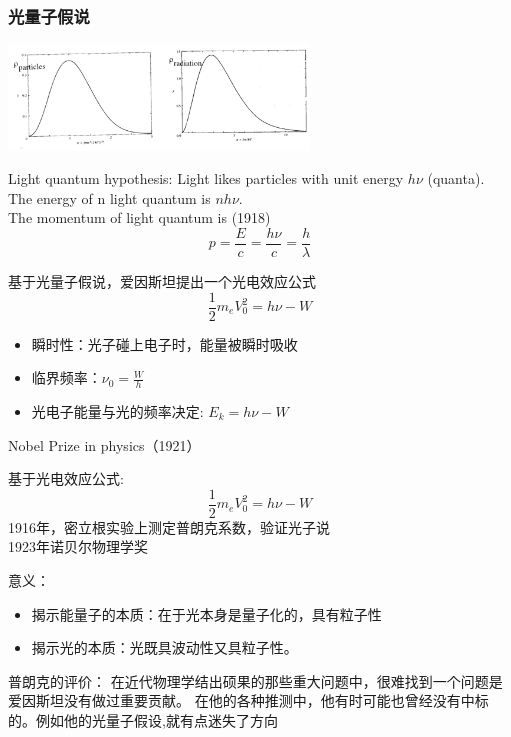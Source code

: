 \begin{frame}  
    \frametitle{光量子假说}  
    \begin{center}
        \includegraphics[width=0.6\textwidth]{figs/mbd.png}
    \end{center}
    \begin{tcolorbox1}{Light quantum hypothesis:}
        \bullet Light likes particles with unit energy $h\nu$ (quanta).\\  
        \bullet The energy of n light quantum is $nh\nu$. \\
        \bullet The momentum of light quantum is (1918)
        \[p=\frac{E}{c}=\frac{h\nu}{c}=\frac{h}{\lambda}\]
    \end{tcolorbox1}
\end{frame}



\begin{frame} 
    基于光量子假说，爱因斯坦提出一个光电效应公式
    $$
    \frac{1}{2}m_eV_0^2=h\nu-W
    $$
    \begin{itemize}
        \item 瞬时性：光子碰上电子时，能量被瞬时吸收
        \item 临界频率：$\nu_0=\frac{W}{h} $
        \item 光电子能量与光的频率决定: $E_k=h\nu-W$
    \end{itemize}
    {\color{deepred} Nobel Prize in physics（1921）}
\end{frame}

\begin{frame} 
    基于光电效应公式:
$$
\frac{1}{2}m_eV_0^2=h\nu-W
$$
1916年，密立根实验上测定普朗克系数，验证光子说\\
1923年诺贝尔物理学奖 
\end{frame}

\begin{frame} 
    \begin{tcolorbox2}{意义：}
        \begin{itemize}
            \item 揭示能量子的本质：在于光本身是量子化的，具有粒子性
            \item 揭示光的本质：光既具波动性又具粒子性。
        \end{itemize}
    \end{tcolorbox2}
    \begin{tcolorbox2}{普朗克的评价：}
    在近代物理学结出硕果的那些重大问题中，很难找到一个问题是爱因斯坦没有做过重要贡献。
    在他的各种推测中，他有时可能也曾经没有中标的。例如他的光量子假设,就有点迷失了方向 
    \end{tcolorbox2}
\end{frame}


